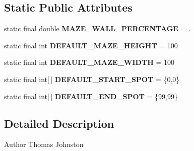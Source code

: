 \subsection*{Static Public Attributes}
\begin{DoxyCompactItemize}
\item 
\hypertarget{interfacecs242_1_1johnst26_1_1maze_1_1_maze_a404e17484fb0ab792ebc4fee37141d26}{static final double {\bfseries M\-A\-Z\-E\-\_\-\-W\-A\-L\-L\-\_\-\-P\-E\-R\-C\-E\-N\-T\-A\-G\-E} = .}\label{interfacecs242_1_1johnst26_1_1maze_1_1_maze_a404e17484fb0ab792ebc4fee37141d26}

\item 
\hypertarget{interfacecs242_1_1johnst26_1_1maze_1_1_maze_a56f8f7e7107ab285ae13506047463be0}{static final int {\bfseries D\-E\-F\-A\-U\-L\-T\-\_\-\-M\-A\-Z\-E\-\_\-\-H\-E\-I\-G\-H\-T} = 100}\label{interfacecs242_1_1johnst26_1_1maze_1_1_maze_a56f8f7e7107ab285ae13506047463be0}

\item 
\hypertarget{interfacecs242_1_1johnst26_1_1maze_1_1_maze_a193571a4a0b5426e5c8a514256aef704}{static final int {\bfseries D\-E\-F\-A\-U\-L\-T\-\_\-\-M\-A\-Z\-E\-\_\-\-W\-I\-D\-T\-H} = 100}\label{interfacecs242_1_1johnst26_1_1maze_1_1_maze_a193571a4a0b5426e5c8a514256aef704}

\item 
\hypertarget{interfacecs242_1_1johnst26_1_1maze_1_1_maze_a6cff30d46abba255be827f0ae4287034}{static final int\mbox{[}$\,$\mbox{]} {\bfseries D\-E\-F\-A\-U\-L\-T\-\_\-\-S\-T\-A\-R\-T\-\_\-\-S\-P\-O\-T} = \{0,0\}}\label{interfacecs242_1_1johnst26_1_1maze_1_1_maze_a6cff30d46abba255be827f0ae4287034}

\item 
\hypertarget{interfacecs242_1_1johnst26_1_1maze_1_1_maze_a49ca767294f8bf54c8689e100224b59b}{static final int\mbox{[}$\,$\mbox{]} {\bfseries D\-E\-F\-A\-U\-L\-T\-\_\-\-E\-N\-D\-\_\-\-S\-P\-O\-T} = \{99,99\}}\label{interfacecs242_1_1johnst26_1_1maze_1_1_maze_a49ca767294f8bf54c8689e100224b59b}

\end{DoxyCompactItemize}


\subsection{Detailed Description}
\begin{DoxyAuthor}{Author}
Thomas Johnston 
\end{DoxyAuthor}


